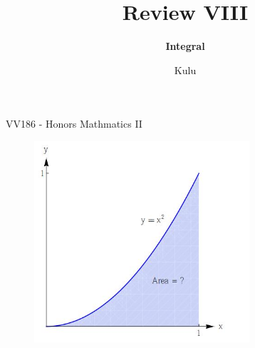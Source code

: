 \documentclass{beamer}
\title{\sffamily Review VIII}
\subtitle{\textbf{Integral}\\ }
\institute[UM-SJTU JI]{University of Michigan-Shanghai Jiao Tong University Joint Institute}
\author{Kulu}
\newcommand{\myfont}{\rmfamily\normalsize\upshape\mdseries}
\begin{document}
\begin{titlepage}
    \begin{center}
        VV186 - Honors Mathmatics II
    \end{center}
\end{titlepage}
\myfont

\begin{frame}
    \begin{figure}[htbp]
        \centering
        \includegraphics[width=8cm]{pic1.png}
    \end{figure}
\end{frame}
\end{document}
